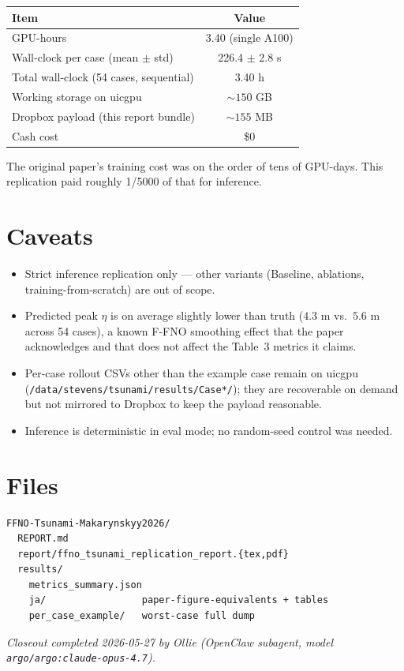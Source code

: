 \documentclass[11pt]{article}
\begin{document}
\begin{center}
\begin{tabular}{lc}
\toprule
Item & Value \\
\midrule
GPU-hours & 3.40 (single A100) \\
Wall-clock per case (mean \(\pm\) std) & 226.4 \(\pm\) 2.8 s \\
Total wall-clock (54 cases, sequential) & 3.40 h \\
Working storage on uicgpu & \(\sim\!150\) GB \\
Dropbox payload (this report bundle) & \(\sim\!155\) MB \\
Cash cost & \$0 \\
\bottomrule
\end{tabular}
\end{center}

The original paper's training cost was on the order of tens of GPU-days.
This replication paid roughly 1/5000 of that for inference.

\section{Caveats}
\begin{itemize}
\item Strict inference replication only --- other variants (Baseline,
  ablations, training-from-scratch) are out of scope.
\item Predicted peak \(\eta\) is on average slightly lower than truth
  (\(4.3\) m vs.\ \(5.6\) m across 54 cases), a known F-FNO smoothing effect
  that the paper acknowledges and that does not affect the Table~3 metrics
  it claims.
\item Per-case rollout CSVs other than the example case remain on uicgpu
  (\texttt{/data/stevens/tsunami/results/Case*/}); they are recoverable on
  demand but not mirrored to Dropbox to keep the payload reasonable.
\item Inference is deterministic in eval mode; no random-seed control was
  needed.
\end{itemize}

\section{Files}
\begin{verbatim}
FFNO-Tsunami-Makarynskyy2026/
  REPORT.md
  report/ffno_tsunami_replication_report.{tex,pdf}
  results/
    metrics_summary.json
    ja/                 paper-figure-equivalents + tables
    per_case_example/   worst-case full dump
\end{verbatim}

\vspace{1em}
\noindent\small\textit{Closeout completed 2026-05-27 by Ollie (OpenClaw
subagent, model \texttt{argo/argo:claude-opus-4.7}).}
\end{document}
